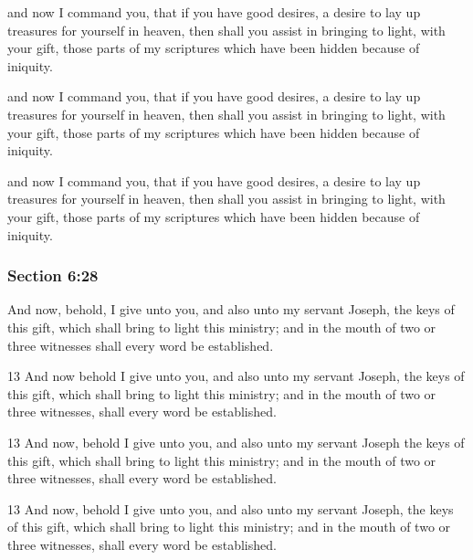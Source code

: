 		\begin{framed}
		\scriptsize
			\begin{compactdesc}
				\item[JSP] and now I command you, that if you have good desires, a desire to lay up treasures for yourself in heaven, then shall you assist in bringing to light, with your gift, those parts of my scriptures which have been hidden because of iniquity.
				\item[DC 1835] and now I command you, that if you have good desires, a desire to lay up treasures for yourself in heaven, then shall you assist in bringing to light, with your gift, those parts of my scriptures which have been hidden because of iniquity.
				\item[DC 1844] and now I command you, that if you have good desires, a desire to lay up treasures for yourself in heaven, then shall you assist in bringing to light, with your gift, those parts of my scriptures which have been hidden because of iniquity.
			\end{compactdesc}
		\end{framed}

	\subsubsection{Section 6:28} %
		\label{DC6-28}

		And now, behold, I give unto you, and also unto my servant Joseph, the keys of this gift, which shall bring to light this ministry; and in the mouth of two or three witnesses shall every word be established.

		\begin{framed}
		\scriptsize
			\begin{compactdesc}
				\item[JSP] 13 And now behold I give unto you, and also unto my servant Joseph, the keys of this gift, which shall bring to light this ministry; and in the mouth of two or three witnesses, shall every word be established.
				\item[DC 1835] 13 And now, behold I give unto you, and also unto my servant Joseph the keys of this gift, which shall bring to light this ministry; and in the mouth of two or three witnesses, shall every word be established.
				\item[DC 1844] 13 And now, behold I give unto you, and also unto my servant Joseph, the keys of this gift, which shall bring to light this ministry; and in the mouth of two or three witnesses, shall every word be established.
			\end{compactdesc}
		\end{framed}

